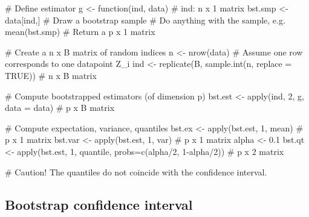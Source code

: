 \begin{code}
 # Define estimator
 g <- function(ind, data){ # ind: n x 1 matrix
    bst.smp <- data[ind,] # Draw a bootstrap sample
    # Do anything with the sample, e.g. mean(bst.smp)
    # Return a p x 1 matrix
 }
 
 # Create a n x B matrix of random indices
 n <- nrow(data) # Assume one row corresponds to one datapoint Z_i
 ind <- replicate(B, sample.int(n, replace = TRUE)) # n x B matrix
 
 # Compute bootstrapped estimators (of dimension p)
 bst.est <- apply(ind, 2, g, data = data) # p x B matrix
 
 # Compute expectation, variance, quantiles
 bst.ex  <- apply(bst.est, 1, mean) # p x 1 matrix
 bst.var <- apply(bst.est, 1, var)  # p x 1 matrix
 alpha <- 0.1
 bst.qt  <- apply(bst.est, 1, quantile, probs=c(alpha/2, 1-alpha/2)) # p x 2 matrix

 # Caution! The quantiles do not coincide with the confidence interval.
 \end{code}
 \subsection{Bootstrap confidence interval}
 

